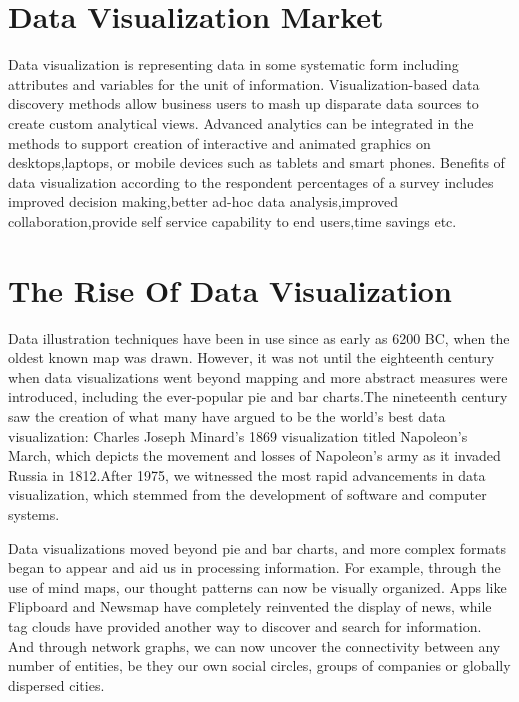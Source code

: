 \section {Data Visualization Market}
Data visualization is representing data in some systematic form including attributes and variables for the unit of information. Visualization-based data discovery methods allow business users to mash up disparate data sources to create custom analytical views. Advanced analytics can be integrated in the methods to support creation of interactive and animated graphics on desktops,laptops, or mobile devices such as tablets and smart phones. Benefits of data visualization according to the respondent percentages of a survey includes improved decision making,better ad-hoc data analysis,improved collaboration,provide self service capability to end users,time savings etc.
\section{The Rise Of Data Visualization}
Data illustration techniques have been in use since as early as 6200 BC, when the oldest known map was drawn. However, it was not until the eighteenth century when data visualizations went beyond mapping and more abstract measures were introduced, including the ever-popular pie and bar charts.The nineteenth century saw the creation of what many have argued to be the world’s best data visualization: Charles Joseph Minard’s 1869 visualization titled Napoleon’s March, which depicts the movement and losses of Napoleon’s army as it invaded Russia in 1812.After 1975, we witnessed the most rapid advancements in data visualization, which stemmed from the development of software and computer systems.\par 
Data visualizations moved beyond pie and bar charts, and more complex formats began to appear and aid us in processing information. For example, through the use of mind maps, our thought patterns can now be visually organized. Apps like Flipboard and Newsmap have completely reinvented the display of news, while tag clouds have provided another way to discover and search for information. And through network graphs, we can now uncover the connectivity between any number of entities, be they our own social circles, groups of companies or globally dispersed cities.
         